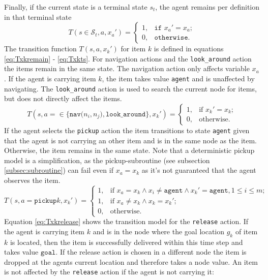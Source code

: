 Finally, if the current state is a terminal state $s_t$, the agent remains per definition in that terminal state
\begin{equation}\label{eq:Tstxa}
    T(s\in\mathcal{S}_t, a, x_a') = \begin{cases}1, &\texttt{if }x_a'=x_a;\\
         0,& \texttt{otherwise}.\end{cases}
\end{equation}
The transition function $T(s, a, x_k')$ for item $k$ is defined in equations \ref{eq:Txkremain} - \ref{eq:Txkts}. For navigation actions and the \texttt{look\_around} action the items remain in the same state. The navigation action only affects variable $x_a$. If the agent is carrying item $k$, the item takes value \texttt{agent} and is unaffected by navigating. The \texttt{look\_around} action is used to search the current node for items, but does not directly affect the items.    
\begin{equation}\label{eq:Txkremain}
    T(s, a=\in\{\texttt{nav($n_i, n_j$)},\texttt{look\_around}\}, x_k') = \begin{cases}
             1, & \text{if }x_k'=x_k;\\
             0, & \text{otherwise}.
         \end{cases}
\end{equation}
If the agent selects the \texttt{pickup} action the item transitions to state \texttt{agent} given that the agent is not carrying an other item and is in the same node as the item. Otherwise, the item remains in the same state. Note that a deterministic pickup model is a simplification, as the pickup-subroutine (see subsection \ref{subsec:subroutine}) can fail even if $x_a=x_k$ as it's not guaranteed that the agent observes the item.
\begin{equation}\label{eq:Txkpickup}
T(s,a=\texttt{pickup}k, x_k') = \begin{cases}
             1, & \text{if }x_a=x_k \land x_i\neq \texttt{agent} \land x_k'=\texttt{agent}, 1\leq i\leq m;  \\
             1, & \text{if }x_a \neq x_k \land x_k=x_k'; \\
             0, & \text{otherwise.}
         \end{cases}
\end{equation}
Equation \ref{eq:Txkrelease} shows the transition model for the \texttt{release} action. If the agent is carrying item $k$ and is in the node where the goal location $g_k$ of item $k$ is located, then the item is successfully delivered within this time step and takes value $\texttt{goal}$. If the release action is chosen in a different node the item is dropped at the agents current location and therefore takes a node value. An item is not affected by the \texttt{release} action if the agent is not carrying it:
